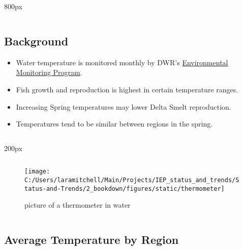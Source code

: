 \documentclass[
]{book}
\providecommand{\tightlist}{%
  \setlength{\itemsep}{0pt}\setlength{\parskip}{0pt}}
\begin{document}
\begin{columns-nocenter}

\begin{column}{800px\textwidth}
\begin{column}

\hypertarget{background-1}{%
\subsection{Background}\label{background-1}}

\begin{itemize}
\tightlist
\item
  Water temperature is monitored monthly by DWR's \href{https://emp.baydeltalive.com/wiki/12297}{Environmental Monitoring Program}.
\item
  Fish growth and reproduction is highest in certain temperature ranges.
\item
  Increasing Spring temperatures may lower Delta Smelt reproduction.
\item
  Temperatures tend to be similar between regions in the spring.
\end{itemize}

\end{column}
\end{column}

\begin{column}{200px\textwidth}
\begin{column}

\begin{figure}

{\centering \texttt{[image: C:/Users/laramitchell/Main/Projects/IEP\_status\_and\_trends/Status-and-Trends/2\_bookdown/figures/static/thermometer]} 

}

\caption{picture of a thermometer in water}\label{fig:unnamed-chunk-12}
\end{figure}

\end{column}
\end{column}

\end{columns-nocenter}

\hypertarget{average-temperature-by-region}{%
\subsection{Average Temperature by Region}\label{average-temperature-by-region}}
\end{document}
